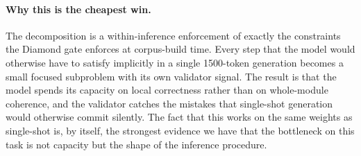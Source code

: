 \documentclass[11pt]{article}
\begin{document}
\paragraph{Why this is the cheapest win.} The decomposition is a
within-inference enforcement of exactly the constraints the Diamond
gate enforces at corpus-build time. Every step that the model would
otherwise have to satisfy implicitly in a single 1500-token generation
becomes a small focused subproblem with its own validator signal. The
result is that the model spends its capacity on local correctness
rather than on whole-module coherence, and the validator catches the
mistakes that single-shot generation would otherwise commit
silently. The fact that this works on the same weights as single-shot
is, by itself, the strongest evidence we have that the bottleneck on
this task is not capacity but the shape of the inference procedure.
\end{document}
